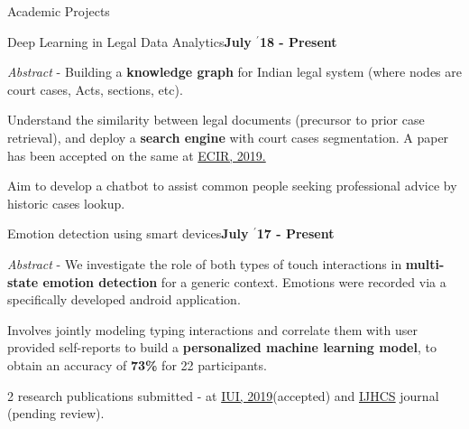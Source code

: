 \documentclass{resume} %
\begin{document}

\begin{rSection}{Academic Projects}

\begin{rSubsection}{ \large Deep Learning in Legal Data Analytics}{\textbf{\large July $^{\prime}$18 - Present}}{}{}
\item \textit{Abstract} - Building a \textbf{knowledge graph} for Indian legal system (where nodes are court cases, Acts, sections, etc).
\item Understand the similarity between legal documents (precursor to prior case retrieval), and deploy a \textbf{search engine} with court cases segmentation. A paper has been accepted on the same at \href{http://ecir2019.org}{ECIR, 2019.}
\item Aim to develop a chatbot to assist common people seeking professional advice by historic cases lookup.
\end{rSubsection}

\vspace{-0.5em}
\begin{rSubsection}{ \large Emotion detection using smart devices}{\textbf{\large July $^{\prime}$17 - Present}}{}{}
\item \textit{Abstract} - We investigate the role of both types of touch interactions in \textbf{multi-state emotion detection} for a generic context. Emotions were recorded via a specifically developed android application.

\item Involves jointly modeling typing interactions and correlate them with user provided self-reports to build a \textbf{personalized machine learning model}, to obtain an accuracy of \textbf{73\%} for 22 participants.

\item 2 research publications submitted - at \href{https://iui.acm.org/2019}{IUI, 2019}(accepted) and \href{https://www.journals.elsevier.com/international-journal-of-human-computer-studies}{IJHCS} journal (pending review).
\end{rSubsection}


\end{rSection}
\end{document}
